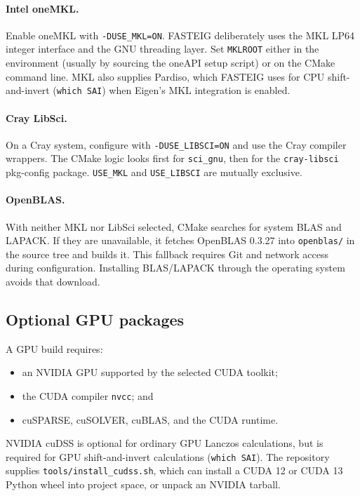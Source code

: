 \documentclass[11pt]{article}
\newcommand{\code}[1]{\texttt{#1}}
\begin{document}
\paragraph{Intel oneMKL.}
Enable oneMKL with \code{-DUSE\_MKL=ON}.  FASTEIG deliberately uses the MKL
LP64 integer interface and the GNU threading layer.  Set \code{MKLROOT} either
in the environment (usually by sourcing the oneAPI setup script) or on the
CMake command line.  MKL also supplies Pardiso, which FASTEIG uses for CPU
shift-and-invert (\code{which SAI}) when Eigen's MKL integration is enabled.

\paragraph{Cray LibSci.}
On a Cray system, configure with \code{-DUSE\_LIBSCI=ON} and use the Cray
compiler wrappers.  The CMake logic looks first for \code{sci\_gnu}, then for
the \code{cray-libsci} pkg-config package.  \code{USE\_MKL} and
\code{USE\_LIBSCI} are mutually exclusive.

\paragraph{OpenBLAS.}
With neither MKL nor LibSci selected, CMake searches for system BLAS and
LAPACK.  If they are unavailable, it fetches OpenBLAS 0.3.27 into
\code{openblas/} in the source tree and builds it.  This fallback requires Git
and network access during configuration.  Installing BLAS/LAPACK through the
operating system avoids that download.

\subsection{Optional GPU packages}

A GPU build requires:
\begin{itemize}[leftmargin=*]
  \item an NVIDIA GPU supported by the selected CUDA toolkit;
  \item the CUDA compiler \code{nvcc}; and
  \item cuSPARSE, cuSOLVER, cuBLAS, and the CUDA runtime.
\end{itemize}

NVIDIA cuDSS is optional for ordinary GPU Lanczos calculations, but is
required for GPU shift-and-invert calculations (\code{which SAI}).  The
repository supplies \code{tools/install\_cudss.sh}, which can install a CUDA
12 or CUDA 13 Python wheel into project space, or unpack an NVIDIA tarball.
\end{document}
